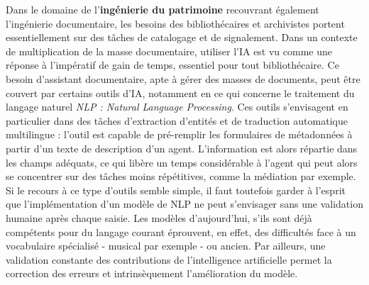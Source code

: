Dans le domaine de l'\textbf{ingénierie du patrimoine} recouvrant également l'ingénierie documentaire, les besoins des bibliothécaires et archivistes portent essentiellement sur des tâches de catalogage et de signalement. Dans un contexte de multiplication de la masse documentaire, utiliser l'IA est vu comme une réponse à l'impératif de gain de temps, essentiel pour tout bibliothécaire. 
Ce besoin d'assistant documentaire, apte à gérer des masses de documents, peut être couvert par certains outils d'IA, notamment en ce qui concerne le traitement du langage naturel \textit{NLP : Natural Language Processing}. Ces outils s'envisagent en particulier dans des tâches d'extraction d'entités et de traduction automatique multilingue : l'outil est capable de pré-remplir les formulaires de métadonnées à partir d'un texte de description d'un agent. L'information est alors répartie dans les champs adéquats, ce qui libère un temps considérable à l'agent qui peut alors se concentrer sur des tâches moins répétitives, comme la médiation par exemple. 
Si le recours à ce type d'outils semble simple, il faut toutefois garder à l'esprit que l'implémentation d'un modèle de NLP ne peut s'envisager sans une validation humaine après chaque saisie. Les modèles d'aujourd'hui, s'ils sont déjà compétents pour du langage courant éprouvent, en effet, des difficultés face à un vocabulaire spécialisé - musical par exemple - ou ancien. Par ailleurs, une validation constante des contributions de l'intelligence artificielle permet la correction des erreurs et intrinsèquement l'amélioration du modèle.


